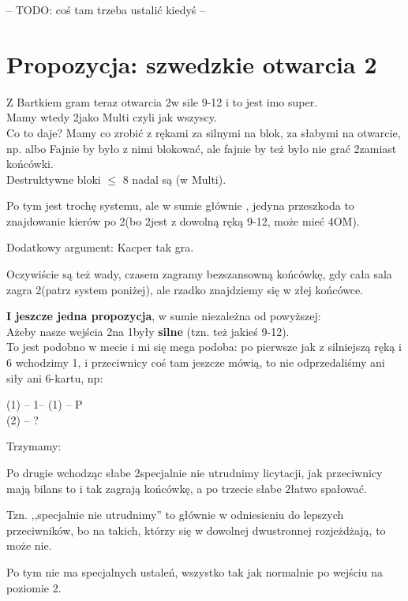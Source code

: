 \documentclass[12pt, a4paper]{report}
\newcommand{\qqq}{{\color{white}{\textbf{\colorbox{red}{\large{?}}}}}}
\begin{document}
-- TODO: coś tam trzeba ustalić kiedyś --

\section*{\colorbox{blue!30}{Propozycja: szwedzkie otwarcia 2\major \qqq}}

Z Bartkiem gram teraz otwarcia 2\major w sile 9-12 i to jest imo super.\\
Mamy wtedy 2\diams jako Multi czyli jak wszyscy.\\
Co to daje? Mamy co zrobić z rękami za silnymi na blok, za słabymi na otwarcie,
np.
albo
Fajnie by było z nimi blokować, ale fajnie by też było nie grać 2\major zamiast końcówki.\\
Destruktywne bloki $\leq$ 8 nadal są (w Multi).

Po tym jest trochę systemu, ale w sumie głównie \nat, jedyna przeszkoda to
znajdowanie kierów po 2\spades (bo 2\major jest z dowolną ręką 9-12, może mieć 4OM).

Dodatkowy argument: Kacper tak gra.

Oczywiście są też wady, czasem zagramy bezszansowną końcówkę, gdy cała sala zagra 2\hearts (patrz system poniżej),
ale rzadko znajdziemy się w złej końcówce.

\textbf{I jeszcze jedna propozycja}, w sumie niezależna od powyższej:\\
Ażeby nasze wejścia 2\major na 1\minor były \textbf{silne} (tzn. też jakieś 9-12).\\
To jest podobno w mecie i mi się mega podoba: po pierwsze jak z silniejszą ręką i 6\major
wchodzimy 1\major, i przeciwnicy coś tam jeszcze mówią, to nie odprzedaliśmy ani siły
ani 6-kartu, np:

\noindent
(1\clubs) -- 1\hearts -- (1\spades) -- P\\
(2\spades) -- ?

\noindent
Trzymamy: 

Po drugie wchodząc słabe 2\major specjalnie nie utrudnimy licytacji, jak przeciwnicy mają bilans
to i tak zagrają końcówkę, a po trzecie słabe 2\major łatwo spałować.

Tzn. ,,specjalnie nie utrudnimy'' to głównie w odniesieniu do lepszych przeciwników,
bo na takich, którzy się w dowolnej dwustronnej rozjeżdżają, to może nie.

Po tym nie ma specjalnych ustaleń, wszystko tak jak normalnie po wejściu na poziomie 2.
\end{document}
